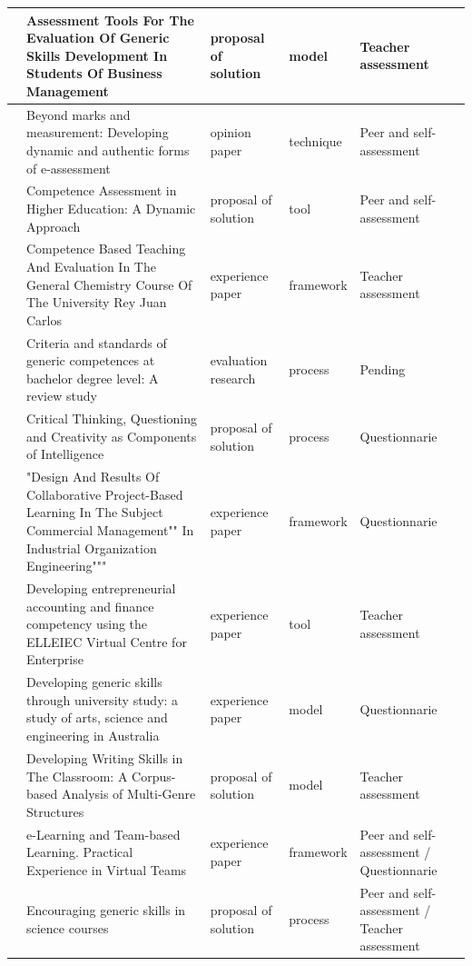 \begin{landscape}
\begin{center}
\begin{longtable}{| m{2.5cm} | m{9cm} | m{4cm} | m{2.5cm} | m{3.5cm} |}
    \hline
    \cite{barbera2011assessment} & Assessment Tools For The Evaluation Of Generic Skills Development In Students Of Business Management & proposal of solution & model & Teacher assessment \\
    \hline
    \cite{mcloughlin2006beyond} & Beyond marks and measurement: Developing dynamic and authentic forms of e-assessment & opinion paper & technique & Peer and self-assessment \\
    \hline
    \cite{achcaoucaou2014competence} & Competence Assessment in Higher Education: A Dynamic Approach & proposal of solution & tool & Peer and self-assessment \\
    \hline
    \cite{prashar2010competence} & Competence Based Teaching And Evaluation In The General Chemistry Course Of The University Rey Juan Carlos & experience paper & framework & Teacher assessment \\
    \hline
    \cite{strijbos2015criteria} & Criteria and standards of generic competences at bachelor degree level: A review study & evaluation research & process & Pending \\
    \hline
    \cite{albergaria2011critical} & Critical Thinking, Questioning and Creativity as Components of Intelligence & proposal of solution & process & Questionnarie \\
    \hline
    \cite{barbera2011design} & "Design And Results Of Collaborative Project-Based Learning In The Subject Commercial Management"" In Industrial Organization Engineering""" & experience paper & framework & Questionnarie \\
    \hline
    \cite{ward2011developing} & Developing entrepreneurial accounting and finance competency using the ELLEIEC Virtual Centre for Enterprise & experience paper & tool & Teacher assessment \\
    \hline
    \cite{badcock2010developing} & Developing generic skills through university study: a study of arts, science and engineering in Australia & experience paper & model & Questionnarie \\
    \hline
    \cite{casan2015developing} & Developing Writing Skills in The Classroom: A Corpus-based Analysis of Multi-Genre Structures & proposal of solution & model & Teacher assessment \\
    \hline
    \cite{ficapal2015learning} & e-Learning and Team-based Learning. Practical Experience in Virtual Teams & experience paper & framework & Peer and self-assessment / Questionnarie \\
    \hline
    \cite{johnson2002encouraging} & Encouraging generic skills in science courses & proposal of solution & process & Peer and self-assessment / Teacher assessment \\

\end{longtable}
\end{center}
\end{landscape}
